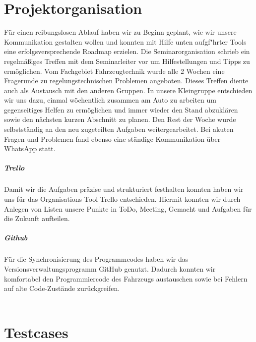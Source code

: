 \section{Projektorganisation}
    F\"ur einen reibungslosen Ablauf haben wir zu Beginn geplant, wie wir unsere Kommunikation gestalten wollen und konnten mit Hilfe unten aufgf\u"hrter Tools eine erfolgsversprechende Roadmap erzielen.
    Die Seminarorganisation schrieb ein regelm\"a\ss{}iges Treffen mit dem Seminarleiter vor um Hilfestellungen und Tipps zu erm\"oglichen. Vom Fachgebiet Fahrzeugtechnik wurde alle 2 Wochen eine Fragerunde zu regelungstechnischen Problemen angeboten. Dieses Treffen diente auch als Austausch mit den anderen Gruppen.
    In unsere Kleingruppe entschieden wir uns dazu, einmal w\"ochentlich zusammen am Auto zu arbeiten um gegenseitiges Helfen zu erm\"oglichen und immer wieder den Stand abzukl\"aren sowie den n\"achsten kurzen Abschnitt zu planen.
    Den Rest der Woche wurde selbstst\"andig an den neu zugeteilten Aufgaben weitergearbeitet.
    Bei akuten Fragen und Problemen fand ebenso eine st\"andige Kommunikation über WhatsApp statt.
    
    \subparagraph{Trello}
    Damit wir die Aufgaben pr\"azise und strukturiert festhalten konnten haben wir uns f\"ur das Organisations-Tool Trello entschieden. Hiermit konnten wir durch Anlegen von Listen unsere Punkte in \glqq ToDo\grqq, \glqq Meeting\grqq, \glqq Gemacht\grqq{} und \glqq Aufgaben f\"ur die Zukunft\grqq{} aufteilen.
    
    \subparagraph{Github}
    F\"ur die Synchronisierung des Programmcodes haben wir das Versionsverwaltungsprogramm GitHub genutzt. Dadurch konnten wir komfortabel den Programmiercode des Fahrzeugs austauschen sowie bei Fehlern auf alte Code-Zust\"ande zur\"uckgreifen.
    \\ \\

\section{Testcases}

